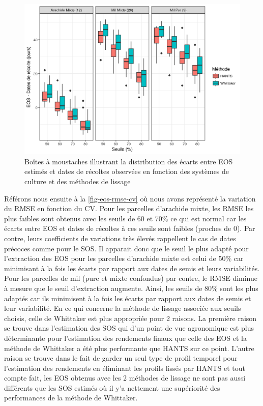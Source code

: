 \begin{figure}[htbp]
 \begin{center}
  \includegraphics[scale=0.7]{resultats_discussions/EOS_Boxplot.png} 
 \end{center}
 \caption[Distribution des écarts entre EOS et dates de récoltes]{Boîtes à moustaches illustrant la distribution des écarts entre EOS estimés et dates de récoltes observées en fonction des systèmes de culture et des méthodes de lissage}
 \label{fig-eosboxplot}
\end{figure}

\newpage

Référons nous ensuite à la \cref{fig-eos-rmse-cv} où nous avons représenté la variation du RMSE en fonction du CV. Pour les parcelles d’arachide mixte, les RMSE les plus faibles sont obtenus avec les seuils de 60 et 70\% ce qui est normal car les écarts entre EOS et dates de récoltes à ces seuils sont faibles (proches de $0$). Par contre, leurs coefficients de variations très élevés rappellent le cas de dates précoces comme pour le SOS. Il apparait donc que le seuil le plus adapté pour l’extraction des EOS pour les parcelles d’arachide mixte est celui de 50\% car minimisant à la fois les écarts par rapport aux
dates de semis et leurs variabilités. Pour les parcelles de mil (pure et mixte confondus) par contre, le RMSE diminue à mesure que le seuil d’extraction augmente. Ainsi, les seuils de 80\% sont les plus adaptés car ils minimisent à la fois les écarts par rapport aux dates de semis et leur variabilité. En ce qui concerne la méthode de lissage
associée aux seuils choisis, celle de Whittaker est plus appropriée pour 2 raisons. La première raison se trouve dans l’estimation des SOS qui d’un point de vue agronomique est plus déterminante pour l’estimation des rendements finaux que celle des EOS et la méthode de Whittaker a été plus performante que HANTS sur ce point. L’autre raison se trouve dans le fait de garder un seul type de profil temporel pour
l’estimation des rendements en éliminant les profils lissés par HANTS et tout compte fait, les EOS obtenus avec les 2 méthodes de lissage ne sont pas aussi différents que les SOS estimés où il y’a nettement une supériorité des performances de la méthode de Whittaker.


